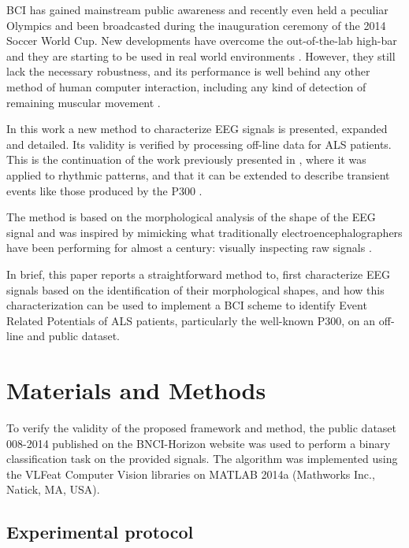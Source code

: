 \documentclass[entropy,article,submit,moreauthors,pdftex,10pt,a4paper]{mdpi}
\begin{document}
BCI has gained mainstream public awareness and recently even held a peculiar Olympics \citep{Riener2014} and been broadcasted during the inauguration ceremony of the 2014 Soccer World Cup.  New developments have overcome the out-of-the-lab high-bar and they are starting to be used in real world environments \citep{Huggins2016}.  However, they still lack the necessary robustness, and its performance is well behind any other method of human computer interaction, including any kind of detection of remaining muscular movement \citep{Clerc}.

In this work a new method to characterize EEG signals is presented, expanded and detailed.  Its validity is verified by processing off-line data for ALS patients.  This is the continuation of the work previously presented in \citep{Ramele2016}, where it was applied to rhythmic patterns, and that it can be extended to describe transient events like those produced by the P300 \citep{Knuth2006}.

The method is based on the morphological analysis of the shape of the EEG signal \citep{Alvarado-Gonzalez2016,Yamaguchi2009} and was inspired by mimicking what traditionally electroencephalographers have been performing for almost a century: visually inspecting  raw signals \citep{Hartman2005}.

In brief, this paper reports a straightforward method to, first characterize EEG signals based on the identification of their morphological shapes, and how this characterization can be used to implement a BCI scheme to identify Event Related Potentials of ALS patients, particularly the well-known P300, on an off-line and public dataset.


\section{Materials and Methods}

To verify the validity of the proposed framework and method, the public dataset 008-2014  \citep{Riccio2013} published on the BNCI-Horizon website \citep{Brunner2014} was used to perform a binary classification task on the provided signals.  The algorithm was implemented using the VLFeat  \citep{Vedaldi2010} Computer Vision libraries on MATLAB 2014a (Mathworks Inc., Natick, MA, USA). 

\subsection{Experimental protocol}
\end{document}
